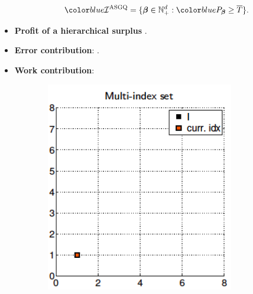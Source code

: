 \documentclass[ima, 20pt, portrait, plainboxedsections]{sciposter}
\begin{document}
\begin{multicols}{3}
\begin{itemize}
 \begin{equation*}
 \blue{\mathcal{I}^{\text{ASGQ}}}=\{\boldsymbol{\beta} \in \mathbb{N}^d_{+}: \blue{P_{\boldsymbol{\beta}}}	 \ge \overline{T}\}.
 \end{equation*}
 	\item \textbf{Profit of a hierarchical surplus} .
 \item \textbf{Error contribution}:  .
 \item \textbf{Work contribution}:  
	\end{itemize}
\begin{figure}
	\centering
	\begin{subfigure}{0.3\textwidth}
		\centering
		\includegraphics[width=0.9\textwidth]{./MISC_construction/1}
		\caption{}
	\end{subfigure}\hfil
	\begin{subfigure}{0.3\textwidth}

\end{subfigure}
\end{figure}
\end{multicols}
\end{document}
